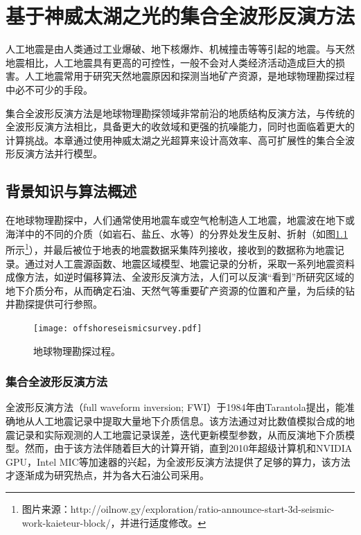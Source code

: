 \documentclass[degree=doctor]{thuthesis}
\begin{document}
\chapter{基于神威太湖之光的集合全波形反演方法}

人工地震是由人类通过工业爆破、地下核爆炸、机械撞击等等引起的地震。与天然地震相比，人工地震具有更高的可控性，一般不会对人类经济活动造成巨大的损害。人工地震常用于研究天然地震原因和探测当地矿产资源，是地球物理勘探过程中必不可少的手段。

集合全波形反演方法是地球物理勘探领域非常前沿的地质结构反演方法，与传统的全波形反演方法相比，具备更大的收敛域和更强的抗噪能力，同时也面临着更大的计算挑战。本章通过使用神威太湖之光超算来设计高效率、高可扩展性的集合全波形反演方法并行模型。

\section{背景知识与算法概述}

在地球物理勘探中，人们通常使用地震车或空气枪制造人工地震，地震波在地下或海洋中的不同的介质（如岩石、盐丘、水等）的分界处发生反射、折射（如图\ref{fig:offshoreseismicsurvey}所示\footnote{图片来源：http://oilnow.gy/exploration/ratio-announce-start-3d-seismic-work-kaieteur-block/，并进行适度修改。}），并最后被位于地表的地震数据采集阵列接收，接收到的数据称为地震记录。通过对人工震源函数、地震区域模型、地震记录的分析，采取一系列地震资料成像方法，如逆时偏移算法、全波形反演方法，人们可以反演“看到”所研究区域的地下介质分布，从而确定石油、天然气等重要矿产资源的位置和产量，为后续的钻井勘探提供可行参照。

\begin{figure}[ht]
  \centering
  \texttt{[image: offshoreseismicsurvey.pdf]}
  \caption{地球物理勘探过程。}
  \label{fig:offshoreseismicsurvey}
\end{figure}

\subsection{集合全波形反演方法}

全波形反演方法（full waveform inversion; FWI）于1984年由Tarantola提出，能准确地从人工地震记录中提取大量地下介质信息\cite{tarantola1984inversion,plessix2012full,brossier2009seismic}。该方法通过对比数值模拟合成的地震记录和实际观测的人工地震记录误差，迭代更新模型参数，从而反演地下介质模型\cite{yushu}。然而，由于该方法伴随着巨大的计算开销，直到2010年超级计算机和NVIDIA GPU，Intel MIC等加速器的兴起，为全波形反演方法提供了足够的算力，该方法才逐渐成为研究热点，并为各大石油公司采用。
\end{document}
